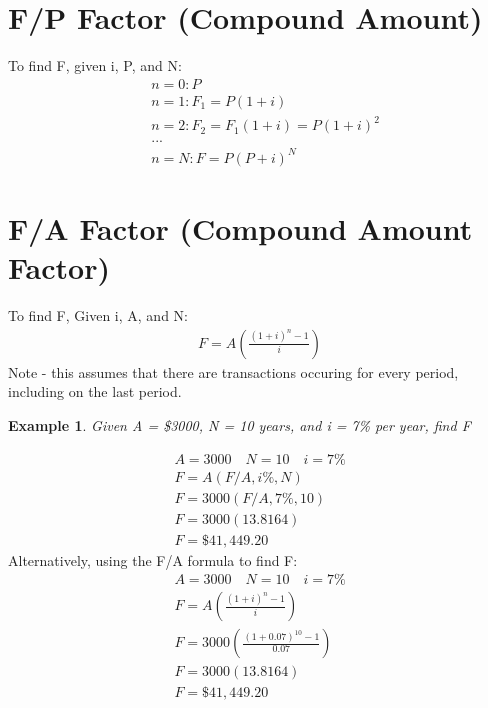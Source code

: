 \documentclass{report} %
\newtheorem{exmp}{Example}
\begin{document}
\section*{F/P Factor (Compound Amount)}
To find F, given i, P, and N:
\begin{equation*}
    \begin{aligned}
        &n = 0:P\\
        &n = 1: F_1 = P(1+i)\\
        &n = 2: F_2=F_1(1+i) = P(1+i)^2\\
        &...\\
        &n = N:F = P(P+i)^N
    \end{aligned}
\end{equation*}

\section*{F/A Factor (Compound Amount Factor)}
To find F, Given i, A, and N:
\begin{equation*}
    \begin{aligned}
        F = A(\frac{(1+i)^n-1}{i})
    \end{aligned}
\end{equation*}
Note - this assumes that there are transactions occuring for every period, including on the last period.

\begin{exmp}
    Given A = \$3000, N = 10 years, and i = 7\% per year, find F
\end{exmp}
\begin{equation*}
    \begin{aligned}
        A = 3000 \quad N = 10 \quad i=7\% \\
        F = A(F/A, i\%, N) \\
        F = 3000(F/A, 7\%, 10) \\
        F = 3000(13.8164) \\
        F = \$41,449.20
    \end{aligned}
\end{equation*}
Alternatively, using the F/A formula to find F:
\begin{equation*}
    \begin{aligned}
        A = 3000 \quad N = 10 \quad i=7\% \\
        F = A(\frac{(1+i)^n-1}{i}) \\
        F = 3000(\frac{(1+0.07)^10-1}{0.07}) \\
        F = 3000(13.8164) \\
        F = \$41,449.20
    \end{aligned}
\end{equation*}
\end{document}
